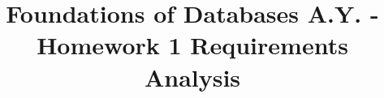 \usepackage[margin=25mm]{geometry}
\usepackage{titlesec}
\usepackage{xcolor}
\usepackage{longtable}
\usepackage{graphicx}
\usepackage{advdate}
\usepackage{cmbright}
\usepackage{array}
\usepackage{makecell}



\usepackage{sectsty}
\setcounter{secnumdepth}{0}
\allsectionsfont{\sffamily\color{UnipdRed}}


\usepackage{fancyhdr}
\pagestyle{fancy}
\renewcommand{\headrulewidth}{0pt}
\renewcommand{\footrulewidth}{0pt}
\setlength\headheight{80.0pt}
\addtolength{\textheight}{-80.0pt}
\cfoot{}



\makeatletter         
\renewcommand\maketitle{
{\raggedright
\begin{center}

{       \Large\bfseries\sffamily     \@title}\\[4ex]     \Large    \textbf{Master Degree in Computer Engineering\\    Master Degree in Cybersecurity\\    Master Degree in ICT for Internet and Multimedia\\}    \large    \vspace{\baselineskip}    \deadline{October 22}    \vspace{30mm}        \end{center}}    \thispagestyle{fancy}    %
}
\makeatother


\newcommand{\hw}{Homework 1 Requirements Analysis}


\title{
Foundations of Databases A.Y. \the\year{}-\AdvanceDate[365]\the\year{}\\
\vspace*{0.5\baselineskip}
\hw}

\newcommand{\deadline}[1]{Deadline: #1, \the\year{}}

